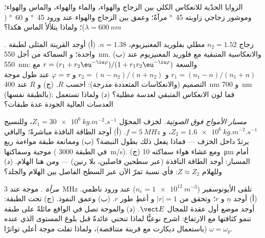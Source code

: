 \begin{exercise}[$\star$]\label{exo:b2:wave-interfaces:4}
الزوايا الحدّية للانعكاس الكلي بين الزجاج والهواء، والماء والهواء،
والماس والهواء؛ وموشور زجاجي زاويته \qty{45}{\degree} مرآةً؛ وعمق
 بين الزجاج والهواء عند ورود \qty{45}{\degree} و \qty{60}{\degree}
($\lambda = \qty{600}{nm}$)؛ ولماذا يتلألأ الماس هكذا؟
\end{exercise}

\begin{exercise}[$\star\star$]\label{exo:b2:wave-interfaces:5}
\emph{.} زجاج $n_2 = 1.52$ مطلي
بفلوريد المغنيزيوم، $n = 1.38$. (أ) أوجد القرينة المثلى لطبقة واحدة؛ و
السماكة من أجل \qty{550}{nm}. (ب) والانعكاسية المتبقية مع فلوريد المغنيزيوم عند
\qty{550}{nm}: والسعة $r = (r_1 + r_2\eu^{-\iu\varphi})/(1 + r_1r_2
\eu^{-\iu\varphi})$ مع $r_1 = (n_1 - n)/(n_1 + n)$ و $r_2 = (n - n_2)/(n + n_2)$
و $\varphi = \pi$ عند طول موجة التصميم (والانعكاسات المتعددة
مدرجة): احسب $R$. (ج) و $R$ عند \qty{400}{nm} و \qty{700}{nm} (بالطبقة
نفسها): فما لون الانعكاس المتبقي لعدسة مطلية؟
(د) ولماذا تستعمل العدسات العالية الجودة عدة طبقات؟
\end{exercise}

\begin{exercise}[$\star\star$]\label{exo:b2:wave-interfaces:6}
\emph{مسبار الأمواج فوق الصوتية.} لخزف المحوّل $Z_1 = \qty{30e6}{kg.m^{-2}.s^{-1}}$،
وللنسيج $Z_2 = \qty{1.6e6}{kg.m^{-2}.s^{-1}}$، و $f = \qty{5}{MHz}$. (أ) أوجد الطاقة
النافذة مباشرةً؛ والباقي يرتدّ داخل الخزف --- فماذا
يفعل ذلك بطول النبضة؟ (ب) وممانعة طبقة مواءمة ربع موجية وسماكتها
( في الطبقة \qty{3000}{m/s}).
(ج) ومع غشاء هواء سماكته \qty{10}{\micro m} أمام المسبار: أوجد الطاقة
النافذة (عبر سطحين فاصلين، بلا رنين) --- ومن هنا الهلام. (د) وللهلام
$Z \approx Z_2$: فأي نسبة تمرّ الآن عبر السطح الفاصل بين الهلام والجلد؟
\end{exercise}

\begin{exercise}[$\star\star$]\label{exo:b2:wave-interfaces:7}
\emph{مرآة .} موجة عند \qty{3}{MHz} تلقى الأيونوسفير ($n_e =
\qty{1e12}{m^{-3}}$) عند ورود ناظمي. (أ) أوجد $\underline n$ و $r$؛ وتحقق من $|r| = 1$ و
أعطِ طور $r$. (ب) وعمق النفوذ. (ج)  تحت
الطبقة: أوجد موضع أول عقدة للمجال $\vect E$. (د) والموجة تصل في الواقع
مائلةً على طبقة تنمو كثافتها مع الارتفاع: اشرح
نوعيًّا لماذا تنحني عائدةً قبل بلوغ المستوى الذي عنده
$\omega = \omega_p$ (باستعمال ديكارت مع قرينة متناقصة)، ولماذا تفلت موجة
أعلى تواترًا.
\end{exercise}

